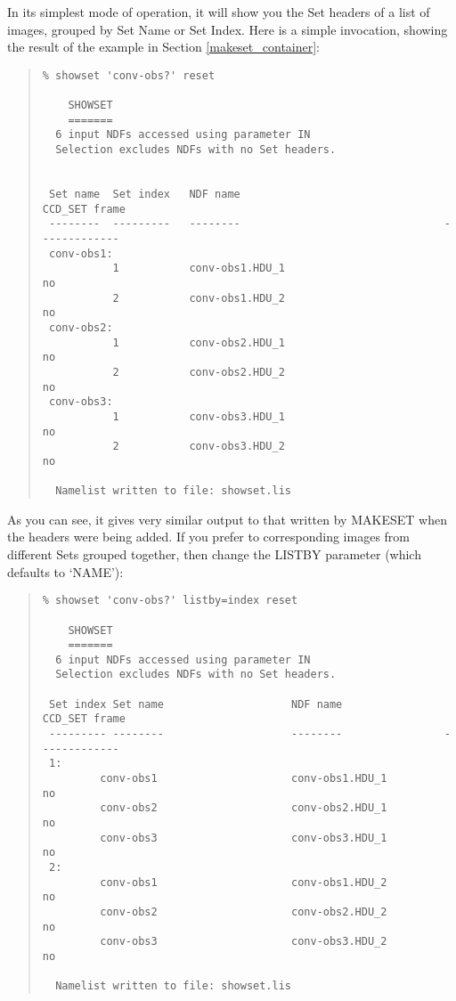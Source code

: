 \documentclass[twoside,11pt]{article}
\newcommand{\latexhtml}[2]{#1}
\renewcommand{\_}{\texttt{\symbol{95}}}
\newcommand{\ttsize}{\latexhtml{\small}{}}
\newenvironment{myquote}{\begin{quote}\ttsize}{\end{quote}}
\newcommand{\routine}[1]{{\sc #1}}
\begin{document}
In its simplest mode of operation, it will show you the Set headers
of a list of images, grouped by Set Name or Set Index.
Here is a simple invocation, showing the result of the
example in Section \ref{makeset_container}:
\begin{myquote}
\begin{verbatim}
% showset 'conv-obs?' reset 

    SHOWSET
    =======
  6 input NDFs accessed using parameter IN
  Selection excludes NDFs with no Set headers.


 Set name  Set index   NDF name                                CCD_SET frame
 --------  ---------   --------                                -------------
 conv-obs1:
           1           conv-obs1.HDU_1                               no
           2           conv-obs1.HDU_2                               no
 conv-obs2:
           1           conv-obs2.HDU_1                               no
           2           conv-obs2.HDU_2                               no
 conv-obs3:
           1           conv-obs3.HDU_1                               no
           2           conv-obs3.HDU_2                               no

  Namelist written to file: showset.lis
\end{verbatim}
\end{myquote}
As you can see, it gives very similar output to that written
by \routine{MAKESET} when the headers were being added.
If you prefer to corresponding images from different Sets grouped together, 
then change the LISTBY parameter (which defaults to `NAME'):
\begin{myquote}
\begin{verbatim}
% showset 'conv-obs?' listby=index reset

    SHOWSET
    =======
  6 input NDFs accessed using parameter IN
  Selection excludes NDFs with no Set headers.

 Set index Set name                    NDF name                CCD_SET frame
 --------- --------                    --------                -------------
 1:
         conv-obs1                     conv-obs1.HDU_1               no
         conv-obs2                     conv-obs2.HDU_1               no
         conv-obs3                     conv-obs3.HDU_1               no
 2:
         conv-obs1                     conv-obs1.HDU_2               no
         conv-obs2                     conv-obs2.HDU_2               no
         conv-obs3                     conv-obs3.HDU_2               no

  Namelist written to file: showset.lis
\end{verbatim}
\end{myquote}
\end{document}
